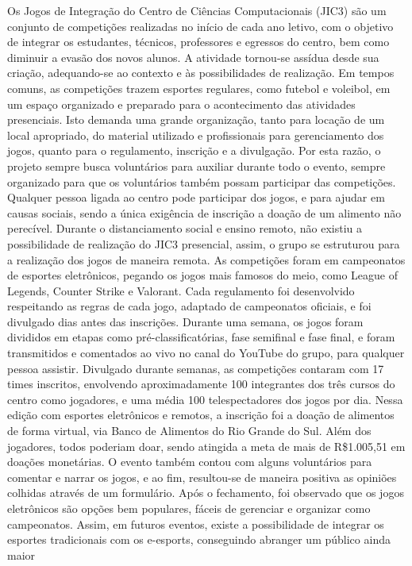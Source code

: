 Os Jogos de Integração do Centro de Ciências Computacionais (JIC3) são um conjunto
de competições realizadas no início de cada ano letivo, com o objetivo de integrar os estudantes,
técnicos, professores e egressos do centro, bem como diminuir a evasão dos novos alunos. A
atividade tornou-se assídua desde sua criação, adequando-se ao contexto e às possibilidades de
realização. Em tempos comuns, as competições trazem esportes regulares, como futebol e
voleibol, em um espaço organizado e preparado para o acontecimento das atividades presenciais.
Isto demanda uma grande organização, tanto para locação de um local apropriado, do material
utilizado e profissionais para gerenciamento dos jogos, quanto para o regulamento, inscrição e a
divulgação. Por esta razão, o projeto sempre busca voluntários para auxiliar durante todo o
evento, sempre organizado para que os voluntários também possam participar das competições.
Qualquer pessoa ligada ao centro pode participar dos jogos, e para ajudar em causas sociais,
sendo a única exigência de inscrição a doação de um alimento não perecível. Durante o
distanciamento social e ensino remoto, não existiu a possibilidade de realização do JIC3
presencial, assim, o grupo se estruturou para a realização dos jogos de maneira remota. As
competições foram em campeonatos de esportes eletrônicos, pegando os jogos mais famosos do
meio, como League of Legends, Counter Strike e Valorant. Cada regulamento foi desenvolvido
respeitando as regras de cada jogo, adaptado de campeonatos oficiais, e foi divulgado dias antes
das inscrições. Durante uma semana, os jogos foram divididos em etapas como
pré-classificatórias, fase semifinal e fase final, e foram transmitidos e comentados ao vivo no
canal do YouTube do grupo, para qualquer pessoa assistir. Divulgado durante semanas, as
competições contaram com 17 times inscritos, envolvendo aproximadamente 100 integrantes dos
três cursos do centro como jogadores, e uma média 100 telespectadores dos jogos por dia. Nessa
edição com esportes eletrônicos e remotos, a inscrição foi a doação de alimentos de forma
virtual, via Banco de Alimentos do Rio Grande do Sul. Além dos jogadores, todos poderiam
doar, sendo atingida a meta de mais de R\$1.005,51 em doações monetárias. O evento também
contou com alguns voluntários para comentar e narrar os jogos, e ao fim, resultou-se de maneira
positiva as opiniões colhidas através de um formulário. Após o fechamento, foi observado que os
jogos eletrônicos são opções bem populares, fáceis de gerenciar e organizar como campeonatos.
Assim, em futuros eventos, existe a possibilidade de integrar os esportes tradicionais com os
e-esports, conseguindo abranger um público ainda maior

